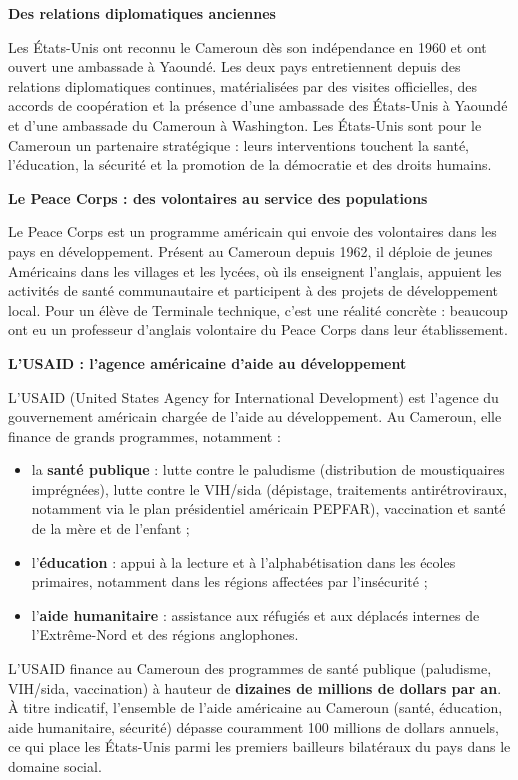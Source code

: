\documentclass[11pt]{article}
\newcommand{\cle}[1]{{\popxbold\color{popdark}#1}}
\begin{document}
\textbf{Des relations diplomatiques anciennes}\par
Les États-Unis ont reconnu le Cameroun dès son indépendance en 1960 et ont ouvert une ambassade à Yaoundé. Les deux pays entretiennent depuis des relations diplomatiques continues, matérialisées par des visites officielles, des accords de coopération et la présence d'une ambassade des États-Unis à Yaoundé et d'une ambassade du Cameroun à Washington. Les États-Unis sont pour le Cameroun un partenaire \cle{stratégique} : leurs interventions touchent la santé, l'éducation, la sécurité et la promotion de la démocratie et des droits humains.

\textbf{Le Peace Corps : des volontaires au service des populations}\par
Le \cle{Peace Corps} est un programme américain qui envoie des volontaires dans les pays en développement. Présent au Cameroun depuis 1962, il déploie de jeunes Américains dans les villages et les lycées, où ils enseignent l'anglais, appuient les activités de santé communautaire et participent à des projets de développement local. Pour un élève de Terminale technique, c'est une réalité concrète : beaucoup ont eu un professeur d'anglais volontaire du Peace Corps dans leur établissement.

\textbf{L'USAID : l'agence américaine d'aide au développement}\par
L'\cle{USAID} (United States Agency for International Development) est l'agence du gouvernement américain chargée de l'aide au développement. Au Cameroun, elle finance de grands programmes, notamment :
\begin{itemize}
\item la \textbf{santé publique} : lutte contre le paludisme (distribution de moustiquaires imprégnées), lutte contre le \cle{VIH/sida} (dépistage, traitements antirétroviraux, notamment via le plan présidentiel américain PEPFAR), vaccination et santé de la mère et de l'enfant ;
\item l'\textbf{éducation} : appui à la lecture et à l'alphabétisation dans les écoles primaires, notamment dans les régions affectées par l'insécurité ;
\item l'\textbf{aide humanitaire} : assistance aux réfugiés et aux déplacés internes de l'Extrême-Nord et des régions anglophones.
\end{itemize}

\begin{exemplebox}
L'USAID finance au Cameroun des programmes de santé publique (paludisme, VIH/sida, vaccination) à hauteur de \textbf{dizaines de millions de dollars par an}. À titre indicatif, l'ensemble de l'aide américaine au Cameroun (santé, éducation, aide humanitaire, sécurité) dépasse couramment 100 millions de dollars annuels, ce qui place les États-Unis parmi les premiers bailleurs bilatéraux du pays dans le domaine social.
\end{exemplebox}
\end{document}
